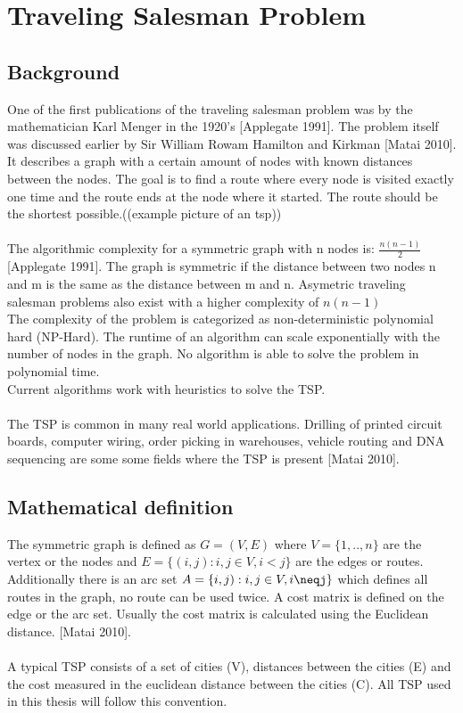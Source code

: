 \chapter{Traveling Salesman Problem}
\label{chap:tsp}
\section{Background}
One of the first publications of the traveling salesman problem was by the mathematician Karl Menger in the 1920's [Applegate 1991]. The problem itself was discussed earlier by Sir William Rowam Hamilton and Kirkman [Matai 2010]. It describes a graph with a certain amount of nodes with known distances between the nodes. The goal is to find a route where every node is visited exactly one time and the route ends at the node where it started. The route should be the shortest possible.((example picture of an tsp))\\\\
The algorithmic complexity for a symmetric graph with n nodes is: $\frac{n(n-1)}{2}$ [Applegate 1991].
The graph is symmetric if the distance between two nodes n and m is the same as the distance between m and n. Asymetric traveling salesman problems also exist with a higher complexity of $n(n-1)$\\
The complexity of the problem is categorized as non-deterministic polynomial hard (NP-Hard). The runtime of an algorithm can scale exponentially with the number of nodes in the graph. No algorithm is able to solve the problem in polynomial time.\\
Current algorithms work with heuristics to solve the TSP.\\\\
The TSP is common in many real world applications. Drilling of printed circuit boards, computer wiring, order picking in warehouses, vehicle routing and DNA sequencing are some some fields where the TSP is present [Matai 2010].
\section{Mathematical definition}
The symmetric graph is defined as $G=(V,E)$ where $V=\{1,..,n\}$ are the vertex or the nodes and $E=\{(i,j):i,j\in V, i<j\}$ are the edges or routes. Additionally there is an arc set $A=\{i,j):i,j\in V, i\neqj\}$ which defines all routes in the graph, no route can be used twice. A cost matrix is defined on the edge or the arc set. Usually the cost matrix is calculated using the Euclidean distance. [Matai 2010].\\\\
A typical TSP consists of a set of cities (V), distances between the cities (E) and the cost measured in the euclidean distance between the cities (C). All TSP used in this thesis will follow this convention. 


 



